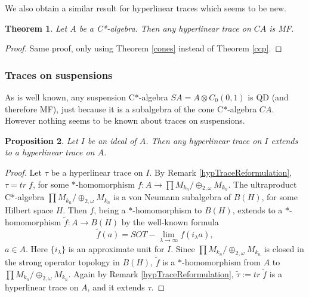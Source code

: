 \documentclass{article}%
\newtheorem{theorem}{Theorem}
\newtheorem{proposition}[theorem]{Proposition}
\begin{document}
\medskip

We also obtain a similar result for hyperlinear traces which seems to be new.

\begin{theorem}\label{MFtraceCone} Let $A$ be  a C*-algebra. Then any hyperlinear trace on $CA$ is MF.
\end{theorem}
\begin{proof} Same proof, only using Theorem \ref{cones} instead of Theorem \ref{ccp}.
\end{proof}

\subsubsection{Traces on suspensions}
As is well known, any suspension C*-algebra $SA = A\otimes C_0(0, 1)$ is QD (and therefore MF), just because it is a subalgebra of the cone C*-algebra $CA$. However nothing seems to be known about traces on suspensions.

\begin{proposition}\label{hypTraceExtention} Let $I$ be an ideal of $A$. Then any hyperlinear trace on $I$ extends to a hyperlinear trace on $A$.
\end{proposition}
\begin{proof} Let $\tau$ be a hyperlinear trace on $I$. By Remark \ref{hypTraceReformulation}, $\tau = tr \; f$, for some $\ast$-homomorphism $f: A \to \prod M_{k_n}/\oplus_{2, \omega} M_{k_n}$. The ultraproduct C*-algebra $\prod M_{k_n}/\oplus_{2, \omega} M_{k_n}$ is a von Neumann subalgebra of $B(H)$, for some Hilbert space $H$. Then $f$, being a $\ast$-homomorphism to $B(H)$, extends to a $\ast$-homomorphism $\tilde f: A \to B(H)$ by the well-known formula $$\tilde f(a) = SOT-\lim_{\lambda\to \infty} f(i_{\lambda}a),$$
$a\in A$. Here $\{i_{\lambda}\}$ is an approximate unit for $I$. Since $\prod M_{k_n}/\oplus_{2, \omega} M_{k_n}$ is closed in the strong operator topology in $B(H)$, $\tilde f$ is a $\ast$-homomorphism from $A$ to $\prod M_{k_n}/\oplus_{2, \omega} M_{k_n}$. Again by Remark \ref{hypTraceReformulation}, $\tilde \tau:= tr \;\tilde f$ is a hyperlinear trace on $A$, and it extends $\tau$.
\end{proof}
\end{document}
